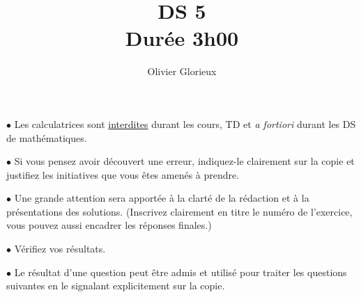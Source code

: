 \documentclass[a4paper, 11pt,reqno]{article}
\author{Olivier Glorieux}
\begin{document}
\title{DS 5\\
\Large{Durée 3h00}
}

\vspace{1cm}
\begin{center}

\begin{description}
\item$\bullet$ Les calculatrices sont \underline{interdites} durant les cours, TD et \emph{a fortiori} durant les DS de mathématiques. \\

\item $\bullet $ Si vous pensez avoir découvert une erreur, indiquez-le clairement sur la copie et justifiez les initiatives que vous êtes amenés à prendre. \\

\item $\bullet$ Une grande attention sera apportée à la clarté de la rédaction et à la présentations des solutions. (Inscrivez clairement en titre le numéro de l'exercice, vous pouvez aussi encadrer les réponses finales.)  \\

\item $\bullet$ Vérifiez vos résultats. \\

\item $\bullet$ Le résultat d'une question peut être admis et utilisé pour traiter les questions suivantes en le signalant explicitement sur la copie. 
\end{description}

\end{center} 
\vspace{1cm}




\newpage
\end{document}
